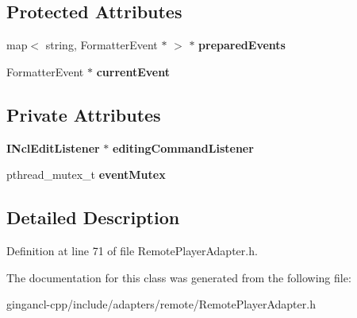 \subsection*{Protected Attributes}
\begin{CompactItemize}
\item 
map$<$ string, FormatterEvent $\ast$ $>$ $\ast$ {\bf preparedEvents}\label{classbr_1_1pucrio_1_1telemidia_1_1ginga_1_1ncl_1_1adapters_1_1remote_1_1RemotePlayerAdapter_a43d2bb8f3756816973fe3cefcdcd569}

\item 
FormatterEvent $\ast$ {\bf currentEvent}\label{classbr_1_1pucrio_1_1telemidia_1_1ginga_1_1ncl_1_1adapters_1_1remote_1_1RemotePlayerAdapter_513496d6a12bbfe8aa02a68a3572701c}

\end{CompactItemize}
\subsection*{Private Attributes}
\begin{CompactItemize}
\item 
{\bf INclEditListener} $\ast$ {\bf editingCommandListener}\label{classbr_1_1pucrio_1_1telemidia_1_1ginga_1_1ncl_1_1adapters_1_1remote_1_1RemotePlayerAdapter_03c0933ef4583b4d5d6bffee883712ae}

\item 
pthread\_\-mutex\_\-t {\bf eventMutex}\label{classbr_1_1pucrio_1_1telemidia_1_1ginga_1_1ncl_1_1adapters_1_1remote_1_1RemotePlayerAdapter_8a8305704a13064a359c8d9cd98597df}

\end{CompactItemize}


\subsection{Detailed Description}




Definition at line 71 of file RemotePlayerAdapter.h.

The documentation for this class was generated from the following file:\begin{CompactItemize}
\item 
gingancl-cpp/include/adapters/remote/RemotePlayerAdapter.h\end{CompactItemize}
